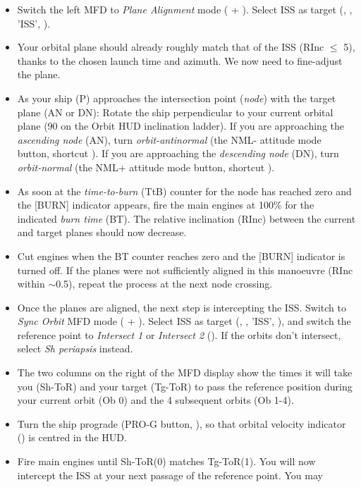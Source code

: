 \documentclass[Orbiter User Manual.tex]{subfiles}
\begin{document}
\begin{itemize}
		burn!
	\item Switch the left MFD to \emph{Plane Alignment} mode
		( + ). Select ISS as target (, \Enter,
		'ISS', \Enter).
	\item Your orbital plane should already roughly match that of the ISS (RInc
		$\leq$ 5\deg{}), thanks to the chosen launch time and azimuth. We now
		need to fine-adjust the plane.
	\item As your ship (P) approaches the intersection point (\emph{node}) with
		the target plane (AN or DN): Rotate the ship perpendicular to your
		current orbital plane (90\deg{} on the Orbit HUD inclination ladder). If
		you are approaching the \emph{ascending node} (AN), turn
		\emph{orbit-antinormal} (the NML- attitude mode button, shortcut
		). If you are approaching the \emph{descending node} (DN),
		turn \emph{orbit-normal} (the NML+ attitude mode button, shortcut
		\keystroke{;}).
	\item As soon at the \emph{time-to-burn} (TtB) counter for the node has
		reached zero and the [BURN] indicator appears, fire the main engines at
		100\% for the indicated \emph{burn time} (BT). The relative inclination
		(RInc) between the current and target planes should now decrease.
	\item Cut engines when the BT counter reaches zero and the [BURN] indicator
		is turned off. If the planes were not sufficiently aligned in this
		manoeuvre (RInc within $\sim$0.5\deg{}), repeat the process at the next
		node crossing.
	\item Once the planes are aligned, the next step is intercepting the ISS.
		Switch to \emph{Sync Orbit} MFD mode ( + ). Select
		ISS as target (, \Enter, 'ISS', \Enter), and switch the
		reference point to \emph{Intersect 1} or \emph{Intersect 2}
		(). If the orbits don't intersect, select \emph{Sh periapsis}
		instead.
	\item The two columns on the right of the MFD display show the times it will
		take you (Sh-ToR) and your target (Tg-ToR) to pass the reference
		position during your current orbit (Ob 0) and the 4 subsequent orbits
		(Ob 1-4).
	\item Turn the ship prograde (PRO-G button, \keystroke{[}), so that orbital
		velocity indicator (\prograde) is centred in the HUD.
	\item Fire main engines until Sh-ToR(0) matches Tg-ToR(1). You will now
		intercept the ISS at your next passage of the reference point. You may

\end{itemize}
\end{document}
